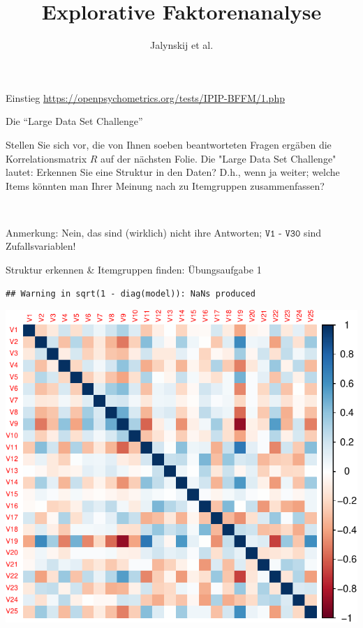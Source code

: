 \documentclass[
  ignorenonframetext,
]{beamer}
\title{Explorative Faktorenanalyse}
\author{Jalynskij et al.}
\date{}
\begin{document}
\frame{\titlepage}

\begin{frame}{Einstieg}
\protect\hypertarget{einstieg}{}
\url{https://openpsychometrics.org/tests/IPIP-BFFM/1.php}
\end{frame}

\begin{frame}{Die ``Large Data Set Challenge''}
\protect\hypertarget{die-large-data-set-challenge}{}
\begin{example}
Stellen Sie sich vor, die von Ihnen soeben beantworteten Fragen ergäben die
Korrelationsmatrix $R$ auf der nächsten Folie. Die "Large Data Set Challenge"
lautet: Erkennen Sie eine Struktur in den Daten? D.h., wenn ja weiter; welche
Items könnten man Ihrer Meinung nach zu Itemgruppen zusammenfassen?
\end{example}

~

Anmerkung: Nein, das sind (wirklich) nicht ihre Antworten;
\(\texttt{V1 - V30}\) sind Zufallsvariablen!
\end{frame}

\begin{frame}[fragile]{Struktur erkennen \& Itemgruppen finden:
Übungsaufgabe 1}
\protect\hypertarget{struktur-erkennen-itemgruppen-finden-uxfcbungsaufgabe-1}{}
\begin{verbatim}
## Warning in sqrt(1 - diag(model)): NaNs produced
\end{verbatim}

\begin{center}\includegraphics[width=0.7\linewidth]{06-EFA_files/figure-beamer/unnamed-chunk-1-1} \end{center}
\end{frame}
\end{document}
